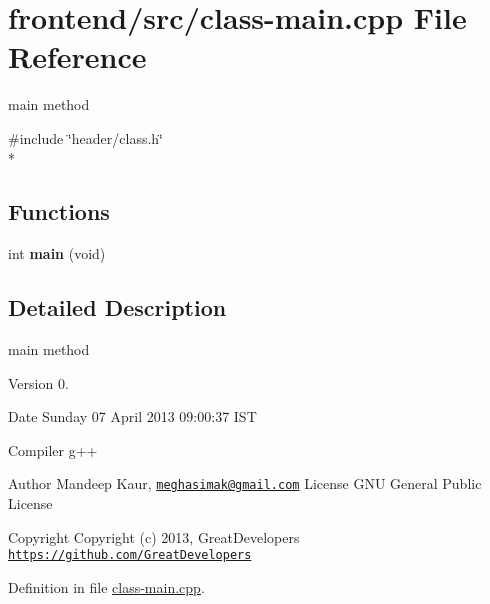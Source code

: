 \hypertarget{class-main_8cpp}{\section{frontend/src/class-\/main.cpp File Reference}
\label{class-main_8cpp}
}


main method  


{\ttfamily \#include \char`\"{}header/class.\-h\char`\"{}}\\*
\subsection*{Functions}
\begin{DoxyCompactItemize}
\item 
\hypertarget{class-main_8cpp_a840291bc02cba5474a4cb46a9b9566fe}{int {\bfseries main} (void)}\label{class-main_8cpp_a840291bc02cba5474a4cb46a9b9566fe}

\end{DoxyCompactItemize}


\subsection{Detailed Description}
main method \begin{DoxyVersion}{Version}
0. 
\end{DoxyVersion}
\begin{DoxyDate}{Date}
Sunday 07 April 2013 09\-:00\-:37 I\-S\-T\par
 Compiler g++
\end{DoxyDate}
\begin{DoxyAuthor}{Author}
Mandeep Kaur, \href{mailto:meghasimak@gmail.com}{\tt meghasimak@gmail.\-com} License G\-N\-U General Public License 
\end{DoxyAuthor}
\begin{DoxyCopyright}{Copyright}
Copyright (c) 2013, Great\-Developers \href{https://github.com/GreatDevelopers}{\tt https\-://github.\-com/\-Great\-Developers} 
\end{DoxyCopyright}


Definition in file \hyperlink{class-main_8cpp_source}{class-\/main.\-cpp}.

